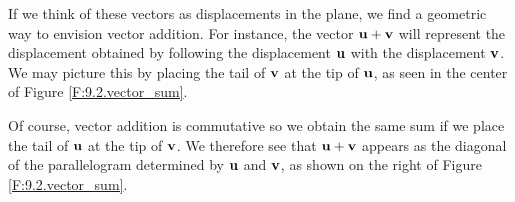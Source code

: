 
If we think of these vectors as displacements in the plane, we 
find a geometric way to envision vector addition.  For instance, the
vector $\mathbf{u} + \mathbf{v}$ will represent the displacement obtained by
following the displacement $\mathbf{u}$ with the displacement $\mathbf{v}$.  We may
picture this by placing the tail of $\mathbf{v}$ at the tip of $\mathbf{u}$, as seen
in the center of Figure \ref{F:9.2.vector_sum}.

Of course, vector addition is commutative so we obtain the same sum if
we place the tail of $\mathbf{u}$ at the tip of $\mathbf{v}$.
We therefore see that $\mathbf{u}+\mathbf{v}$ appears as
the 
diagonal of the
parallelogram determined by $\mathbf{u}$ and
$\mathbf{v}$, as shown on the right of Figure \ref{F:9.2.vector_sum}. 


